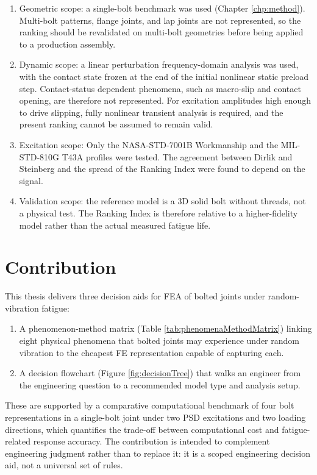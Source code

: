 \documentclass[a4paper,twoside]{bth}
\begin{document}
\begin{enumerate}
    \item Geometric scope: a single-bolt benchmark was used (Chapter \ref{chp:method}). Multi-bolt patterns, flange joints, and lap joints are not represented, so the ranking should be revalidated on multi-bolt geometries before being applied to a production assembly.
    \item Dynamic scope: a linear perturbation frequency-domain analysis was used, with the contact state frozen at the end of the initial nonlinear static preload step. Contact-status dependent phenomena, such as macro-slip and contact opening, are therefore not represented. For excitation amplitudes high enough to drive slipping, fully nonlinear transient analysis is required, and the present ranking cannot be assumed to remain valid.
    \item Excitation scope: Only the NASA-STD-7001B Workmanship and the MIL-STD-810G T43A profiles were tested. The agreement between Dirlik and Steinberg and the spread of the Ranking Index were found to depend on the signal.
    \item Validation scope: the reference model is a 3D solid bolt without threads, not a physical test. The Ranking Index is therefore relative to a higher-fidelity model rather than the actual measured fatigue life.
\end{enumerate}

\section{Contribution}
This thesis delivers three decision aids for \ac{FEA} of bolted joints under random-vibration fatigue:
\begin{enumerate}
    \item A phenomenon-method matrix (Table \ref{tab:phenomenaMethodMatrix}) linking eight physical phenomena that bolted joints may experience under random vibration to the cheapest \ac{FE} representation capable of capturing each.
    \item A decision flowchart (Figure \ref{fig:decisionTree}) that walks an engineer from the engineering question to a recommended model type and analysis setup.
\end{enumerate}

These are supported by a comparative computational benchmark of four bolt representations in a single-bolt joint under two \ac{PSD} excitations and two loading directions, which quantifies the trade-off between computational cost and fatigue-related response accuracy. The contribution is intended to complement engineering judgment rather than to replace it: it is a scoped engineering decision aid, not a universal set of rules.
\end{document}
